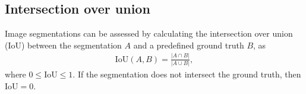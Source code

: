 
\subsection{Intersection over union}
Image segmentations can be assessed by calculating the intersection over union (IoU) between the segmentation $A$ and a predefined ground truth $B$, as
\begin{align}
    \mathrm{IoU}(A, B) = \frac{|A \cap B|}{|A \cup B|},
\end{align}
where $0 \leq \mathrm{IoU} \leq 1$.
If the segmentation does not intersect the ground truth, then $\mathrm{IoU} = 0$.

